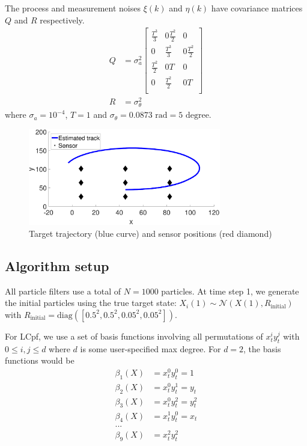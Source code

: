 \documentclass[10pt,letterpaper,final]{article}
\begin{document}
The process and measurement noises $\xi(k)$ and $\eta(k)$ have covariance matrices $Q$ and $R$ respectively.
\begin{align}
Q &= \sigma_a^2
\left[
\begin{array}{cccc}
\frac{T^3}{3} & 0 \frac{T^2}{2} & 0 \\
0 & \frac{T^3}{3} & 0 \frac{T^2}{2} \\
\frac{T^2}{2} & 0 T & 0 \\
0 & \frac{T^2}{2} & 0 T \\
\end{array}
\right]\\
R &= \sigma_{\theta}^2
\end{align}
where $\sigma_a=10^{-4}$, $T=1$ and $\sigma_{\theta}=0.0873\text{ rad} = 5 \text{ degree}$.

\begin{figure}
\centering
\includegraphics[width=0.75\textwidth]{Figures/track}
\caption{Target trajectory (blue curve) and sensor positions (red diamond)}
\label{fig:track}
\end{figure}

\subsection{Algorithm setup}
All particle filters use a total of $N=1000$ particles. At time step 1, we generate the initial particles using the true target state: $X_i(1) \sim \mathcal{N}(X(1), R_{\text{initial}})$ with $R_{\text{initial}}=\text{diag}([0.5^2,0.5^2,0.05^2,0.05^2])$. 

For LCpf, we use a set of basis functions involving all permutations of $x_t^iy_t^j$ with $0\leq i, j \leq d$ where $d$ is some user-specified max degree. For $d=2$, the basis functions would be
\begin{align*}
\beta_1(X) &= x_t^0 y_t^0 = 1 \\
\beta_2(X) &= x_t^0 y_t^1 = y_t \\
\beta_3(X) &= x_t^0 y_t^2 = y_t^2 \\
\beta_4(X) &= x_t^1 y_t^0 = x_t \\
... \\
\beta_9(X) &= x_t^2 y_t^2 
\end{align*}
\end{document}
